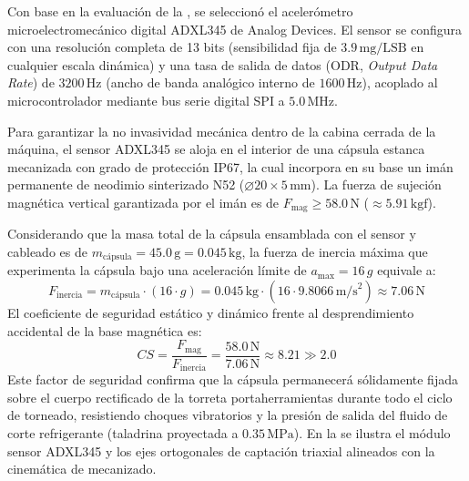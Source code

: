 Con base en la evaluación de la , se seleccionó el acelerómetro microelectromecánico digital ADXL345 de Analog Devices. El sensor se configura con una resolución completa de 13 bits (sensibilidad fija de $3.9\,\text{mg/LSB}$ en cualquier escala dinámica) y una tasa de salida de datos (ODR, \textit{Output Data Rate}) de $3200\,\text{Hz}$ (ancho de banda analógico interno de $1600\,\text{Hz}$), acoplado al microcontrolador mediante bus serie digital SPI a $5.0\,\text{MHz}$.

Para garantizar la no invasividad mecánica dentro de la cabina cerrada de la máquina, el sensor ADXL345 se aloja en el interior de una cápsula estanca mecanizada con grado de protección IP67, la cual incorpora en su base un imán permanente de neodimio sinterizado N52 ($\varnothing 20 \times 5\,\text{mm}$). La fuerza de sujeción magnética vertical garantizada por el imán es de $F_{\text{mag}} \ge 58.0\,\text{N}$ ($\approx 5.91\,\text{kgf}$). 

Considerando que la masa total de la cápsula ensamblada con el sensor y cableado es de $m_{\text{cápsula}} = 45.0\,\text{g} = 0.045\,\text{kg}$, la fuerza de inercia máxima que experimenta la cápsula bajo una aceleración límite de $a_{\max} = 16\,g$ equivale a:
\begin{equation}
F_{\text{inercia}} = m_{\text{cápsula}} \cdot (16 \cdot g) = 0.045\,\text{kg} \cdot (16 \cdot 9.8066\,\text{m/s}^2) \approx 7.06\,\text{N}
\label{eq:mp_fuerza_inercia_adxl}
\end{equation}
El coeficiente de seguridad estático y dinámico frente al desprendimiento accidental de la base magnética es:
\begin{equation}
CS = \frac{F_{\text{mag}}}{F_{\text{inercia}}} = \frac{58.0\,\text{N}}{7.06\,\text{N}} \approx 8.21 \gg 2.0
\label{eq:mp_factor_seguridad_iman}
\end{equation}
Este factor de seguridad confirma que la cápsula permanecerá sólidamente fijada sobre el cuerpo rectificado de la torreta portaherramientas durante todo el ciclo de torneado, resistiendo choques vibratorios y la presión de salida del fluido de corte refrigerante (taladrina proyectada a $0.35\,\text{MPa}$). En la  se ilustra el módulo sensor ADXL345 y los ejes ortogonales de captación triaxial alineados con la cinemática de mecanizado.


